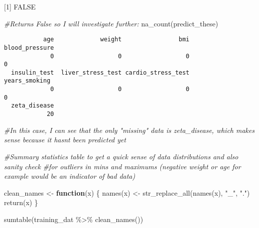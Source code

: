 \documentclass[
]{article}
\newenvironment{Shaded}{\begin{snugshade}}{\end{snugshade}}
\newcommand{\CommentTok}[1]{\textcolor[rgb]{0.56,0.35,0.01}{\textit{#1}}}
\newcommand{\ControlFlowTok}[1]{\textcolor[rgb]{0.13,0.29,0.53}{\textbf{#1}}}
\newcommand{\FunctionTok}[1]{\textcolor[rgb]{0.00,0.00,0.00}{#1}}
\newcommand{\NormalTok}[1]{#1}
\newcommand{\OtherTok}[1]{\textcolor[rgb]{0.56,0.35,0.01}{#1}}
\newcommand{\SpecialCharTok}[1]{\textcolor[rgb]{0.00,0.00,0.00}{#1}}
\newcommand{\StringTok}[1]{\textcolor[rgb]{0.31,0.60,0.02}{#1}}
\begin{document}
{[}1{]} FALSE

\begin{Shaded}
\begin{Highlighting}[]
\CommentTok{\#Returns False so I will investigate further:}
\FunctionTok{na\_count}\NormalTok{(predict\_these)}
\end{Highlighting}
\end{Shaded}

\begin{verbatim}
           age             weight                bmi     blood_pressure 
             0                  0                  0                  0 
  insulin_test  liver_stress_test cardio_stress_test      years_smoking 
             0                  0                  0                  0 
  zeta_disease 
            20 
\end{verbatim}

\begin{Shaded}
\begin{Highlighting}[]
\CommentTok{\#In this case, I can see that the only "missing" data is zeta\_disease, which makes sense because it hasn\textquotesingle{}t been predicted yet}


\CommentTok{\#Summary statistics table to get a quick sense of data distributions and also sanity check }
\CommentTok{\#for outliers in mins and maximums (negative weight or age for example would be an indicator of bad data)}

\NormalTok{clean\_names }\OtherTok{\textless{}{-}} \ControlFlowTok{function}\NormalTok{(x) \{}
  \FunctionTok{names}\NormalTok{(x) }\OtherTok{\textless{}{-}} \FunctionTok{str\_replace\_all}\NormalTok{(}\FunctionTok{names}\NormalTok{(x), }\StringTok{"\_"}\NormalTok{, }\StringTok{"."}\NormalTok{)}
  \FunctionTok{return}\NormalTok{(x)}
\NormalTok{\}}

\FunctionTok{sumtable}\NormalTok{(training\_dat }\SpecialCharTok{\%\textgreater{}\%} \FunctionTok{clean\_names}\NormalTok{())}
\end{Highlighting}
\end{Shaded}
\end{document}
